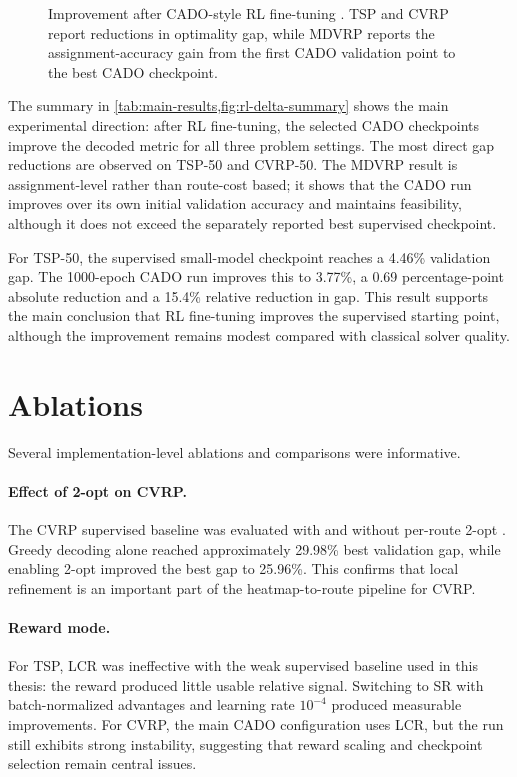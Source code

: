 \begin{figure}[t]
\centering

\caption{Improvement after CADO-style RL fine-tuning \citep{yoon2024cado}. TSP and CVRP report reductions in optimality gap, while MDVRP reports the assignment-accuracy gain from the first CADO validation point to the best CADO checkpoint.}
\label{fig:rl-delta-summary}
\end{figure}

The summary in \cref{tab:main-results,fig:rl-delta-summary} shows the main experimental direction: after RL fine-tuning, the selected CADO checkpoints improve the decoded metric for all three problem settings. The most direct gap reductions are observed on TSP-50 and CVRP-50. The MDVRP result is assignment-level rather than route-cost based; it shows that the CADO run improves over its own initial validation accuracy and maintains feasibility, although it does not exceed the separately reported best supervised checkpoint.

For TSP-50, the supervised small-model checkpoint reaches a 4.46\% validation gap. The 1000-epoch CADO run improves this to 3.77\%, a 0.69 percentage-point absolute reduction and a 15.4\% relative reduction in gap. This result supports the main conclusion that RL fine-tuning improves the supervised starting point, although the improvement remains modest compared with classical solver quality.

\section{Ablations}
\label{sec:ablations}

Several implementation-level ablations and comparisons were informative.

\paragraph{Effect of 2-opt on CVRP.}
The CVRP supervised baseline was evaluated with and without per-route 2-opt \citep{croes1958method}. Greedy decoding alone reached approximately 29.98\% best validation gap, while enabling 2-opt improved the best gap to 25.96\%. This confirms that local refinement is an important part of the heatmap-to-route pipeline for CVRP.

\paragraph{Reward mode.}
For TSP, LCR was ineffective with the weak supervised baseline used in this thesis: the reward produced little usable relative signal. Switching to SR with batch-normalized advantages and learning rate $10^{-4}$ produced measurable improvements. For CVRP, the main CADO configuration uses LCR, but the run still exhibits strong instability, suggesting that reward scaling and checkpoint selection remain central issues.

